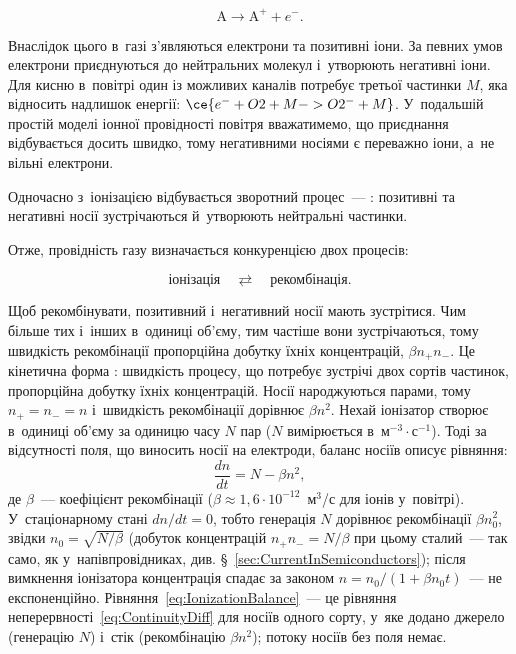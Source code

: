 \begin{equation*}
	\mathrm{A}\longrightarrow \mathrm{A}^+ + e^-.
\end{equation*}

Внаслідок цього в~газі з'являються електрони та позитивні іони. За певних умов електрони
приєднуються до нейтральних молекул і~утворюють негативні іони. Для кисню в~повітрі один
із можливих каналів потребує третьої частинки $M$, яка відносить надлишок енергії:
$\ce{e^- + O2 + M -> O2^- + M}$. У~подальшій простій моделі іонної провідності повітря
вважатимемо, що приєднання відбувається досить швидко, тому негативними носіями є переважно
іони, а~не вільні електрони.

Одночасно з~іонізацією відбувається зворотний процес~--- : позитивні
та негативні носії зустрічаються й~утворюють нейтральні частинки.

Отже, провідність газу визначається конкуренцією двох процесів:

\begin{equation*}
	\text{іонізація}\quad\rightleftarrows\quad\text{рекомбінація}.
\end{equation*}

Щоб рекомбінувати, позитивний і~негативний носії мають зустрітися. Чим більше тих і~інших
в~одиниці об'єму, тим частіше вони зустрічаються, тому швидкість рекомбінації пропорційна
добутку їхніх концентрацій, $\beta n_+n_-$. Це кінетична форма :
швидкість процесу, що потребує зустрічі двох сортів частинок, пропорційна добутку їхніх
концентрацій. Носії народжуються парами, тому $n_+=n_-=n$ і~швидкість рекомбінації
дорівнює $\beta n^2$. Нехай іонізатор створює в~одиниці об'єму за одиницю часу $N$ пар
($N$ вимірюється в~м$^{-3}\cdot$с$^{-1}$). Тоді за відсутності поля, що виносить носії на
електроди, баланс носіїв описує рівняння:
\begin{equation}\label{eq:IonizationBalance}
	\frac{dn}{dt} = N - \beta n^2,
\end{equation}
де $\beta$~--- коефіцієнт рекомбінації ($\beta\approx1{,}6\cdot10^{-12}$~м$^3$/с для іонів
у~повітрі). У~стаціонарному стані $dn/dt=0$, тобто генерація $N$ дорівнює рекомбінації
$\beta n_0^2$, звідки $n_0=\sqrt{N/\beta}$ (добуток концентрацій $n_+n_-=N/\beta$ при
цьому сталий~--- так само, як у~напівпровідниках, див.
\S~\ref{sec:CurrentInSemiconductors}); після вимкнення іонізатора концентрація спадає
за законом $n=n_0/(1+\beta n_0t)$~--- не експоненційно.
Рівняння~\eqref{eq:IonizationBalance}~--- це рівняння
неперервності~\eqref{eq:ContinuityDiff} для носіїв одного сорту, у~яке додано джерело
(генерацію $N$) і~стік (рекомбінацію $\beta n^2$); потоку носіїв без поля немає.


